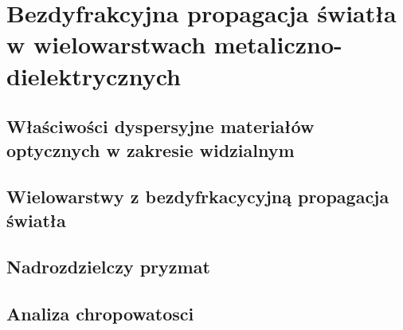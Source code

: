 \chapter{Bezdyfrakcyjna propagacja światła w wielowarstwach metaliczno-dielektrycznych}
\label{art:nondiff}

\section{Właściwości dyspersyjne materiałów optycznych w zakresie widzialnym}

\section{Wielowarstwy z bezdyfrkacycyjną propagacja światła}

\section{Nadrozdzielczy pryzmat}


\section{Analiza chropowatosci}



